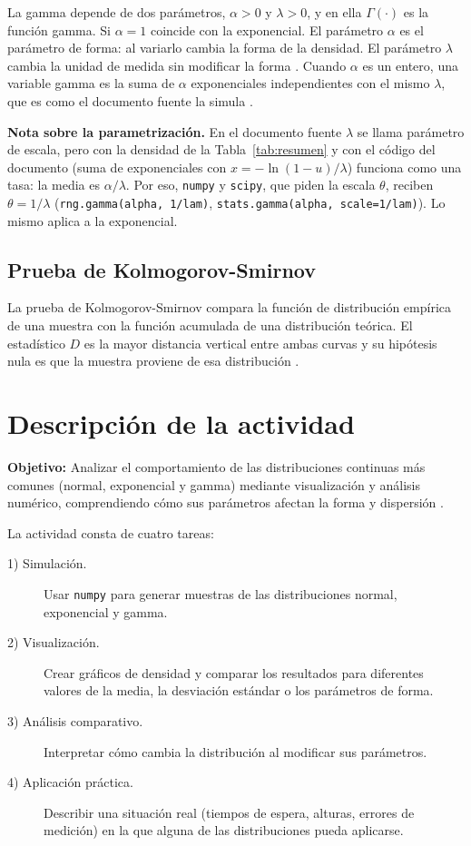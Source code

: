\documentclass[11pt,letterpaper]{article}
\begin{document}
La gamma depende de dos parámetros, $\alpha > 0 $ y $\lambda > 0$, y en ella $\Gamma(\cdot)$ es la función gamma. Si $\alpha = 1$ coincide con la exponencial. El parámetro $\alpha$ es el parámetro de forma: al variarlo cambia la forma de la densidad. El parámetro $\lambda$ cambia la unidad de medida sin modificar la forma \parencite{tecnm2026_documento_fuente}. Cuando $\alpha$ es un entero, una variable gamma es la suma de $\alpha$ exponenciales independientes con el mismo $\lambda$, que es como el documento fuente la simula \parencite{tecnm2026_documento_fuente}.

\textbf{Nota sobre la parametrización.} En el documento fuente $\lambda$ se llama parámetro de escala, pero con la densidad de la Tabla~\ref{tab:resumen} y con el código del documento (suma de exponenciales con $x = -\ln(1 - u)/\lambda$) funciona como una tasa: la media es $\alpha/\lambda$. Por eso, \texttt{numpy} y \texttt{scipy}, que piden la escala $\theta$, reciben $\theta = 1/\lambda$ (\texttt{rng.gamma(alpha, 1/lam)}, \texttt{stats.gamma(alpha, scale=1/lam)}). Lo mismo aplica a la exponencial.

\subsection{Prueba de Kolmogorov-Smirnov}

La prueba de Kolmogorov-Smirnov compara la función de distribución empírica de una muestra con la función acumulada de una distribución teórica. El estadístico $D$ es la mayor distancia vertical entre ambas curvas y su hipótesis nula es que la muestra proviene de esa distribución \parencite{tecnm2026_documento_fuente}.

\section{Descripción de la actividad}

\textbf{Objetivo:} Analizar el comportamiento de las distribuciones continuas más comunes (normal, exponencial y gamma) mediante visualización y análisis numérico, comprendiendo cómo sus parámetros afectan la forma y dispersión \parencite{tecnm2026_documento_fuente}.

La actividad consta de cuatro tareas:

\begin{description}
    \item[1) Simulación.] Usar \texttt{numpy} para generar muestras de las distribuciones normal, exponencial y gamma.
    \item[2) Visualización.] Crear gráficos de densidad y comparar los resultados para diferentes valores de la media, la desviación estándar o los parámetros de forma.
    \item[3) Análisis comparativo.] Interpretar cómo cambia la distribución al modificar sus parámetros.
    \item[4) Aplicación práctica.] Describir una situación real (tiempos de espera, alturas, errores de medición) en la que alguna de las distribuciones pueda aplicarse.
\end{description}
\end{document}
